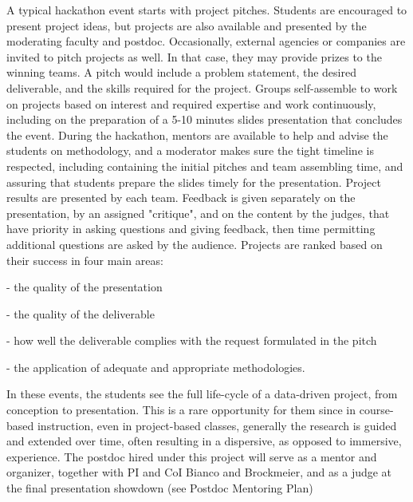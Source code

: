 A typical hackathon event starts with project pitches.  Students are encouraged to present project ideas, but projects are also available and presented by the moderating faculty and postdoc.  Occasionally, external agencies or companies are invited to pitch projects as well.  In that case, they may provide prizes to the winning teams.  A pitch would include a problem statement, the desired deliverable, and the skills required for the project.
Groups self-assemble to work on projects based on interest and required expertise and work continuously, including on the preparation of a 5-10 minutes slides presentation that concludes the event.  During the hackathon, mentors are available to help and advise the students on methodology, and a moderator makes sure the tight timeline is respected, including containing the initial pitches and team assembling time, and assuring that students prepare the slides timely for the presentation. 
Project results are presented by each team.  Feedback is given separately on the presentation, by an assigned "critique", and on the content by the judges, that have priority in asking questions and giving feedback, then time permitting additional questions are asked by the audience.  Projects are ranked based on their success in four main areas: 

- the quality of the presentation

- the quality of the deliverable

- how well the deliverable complies with the request formulated in the pitch 

- the application of adequate and appropriate methodologies.

In these events, the students see the full life-cycle of a data-driven project, from conception to presentation.  This is a rare opportunity for them since in course-based instruction, even in project-based classes, generally the research is guided and extended over time, often resulting in a dispersive, as opposed to immersive, experience. The postdoc hired under this project will serve as a mentor and organizer, together with PI and CoI Bianco and Brockmeier, and as a judge at the final presentation showdown (see Postdoc Mentoring Plan)
